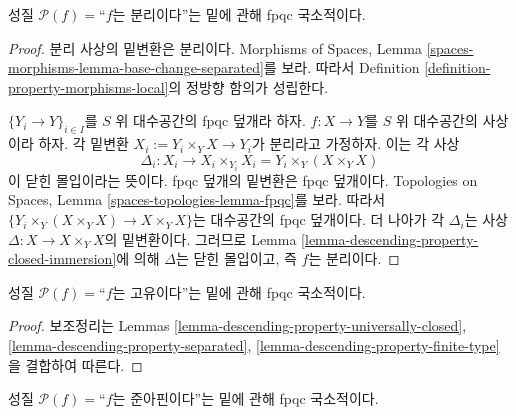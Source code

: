 \begin{lemma}
\label{lemma-descending-property-separated}
성질 $\mathcal{P}(f)=$``$f$는 분리이다''는 밑에 관해 fpqc 국소적이다.
\end{lemma}

\begin{proof}
분리 사상의 밑변환은 분리이다. Morphisms of Spaces, Lemma
\ref{spaces-morphisms-lemma-base-change-separated}를 보라. 따라서
Definition \ref{definition-property-morphisms-local}의 정방향 함의가
성립한다.

\medskip\noindent
$\{Y_i\to Y\}_{i\in I}$를 $S$ 위 대수공간의 fpqc 덮개라 하자.
$f:X\to Y$를 $S$ 위 대수공간의 사상이라 하자. 각 밑변환
$X_i:=Y_i\times_YX\to Y_i$가 분리라고 가정하자. 이는 각 사상
$$
\Delta_i:
X_i
\longrightarrow
X_i \times_{Y_i} X_i = Y_i \times_Y (X \times_Y X)
$$
이 닫힌 몰입이라는 뜻이다. fpqc 덮개의 밑변환은 fpqc 덮개이다.
Topologies on Spaces, Lemma \ref{spaces-topologies-lemma-fpqc}를 보라.
따라서 $\{Y_i\times_Y(X\times_YX)\to X\times_YX\}$는 대수공간의
fpqc 덮개이다. 더 나아가 각 $\Delta_i$는 사상
$\Delta:X\to X\times_YX$의 밑변환이다. 그러므로 Lemma
\ref{lemma-descending-property-closed-immersion}에 의해 $\Delta$는 닫힌
몰입이고, 즉 $f$는 분리이다.
\end{proof}

\begin{lemma}
\label{lemma-descending-property-proper}
성질 $\mathcal{P}(f)=$``$f$는 고유이다''는 밑에 관해 fpqc 국소적이다.
\end{lemma}

\begin{proof}
보조정리는 Lemmas \ref{lemma-descending-property-universally-closed},
\ref{lemma-descending-property-separated},
\ref{lemma-descending-property-finite-type}을 결합하여 따른다.
\end{proof}

\begin{lemma}
\label{lemma-descending-property-quasi-affine}
성질 $\mathcal{P}(f)=$``$f$는 준아핀이다''는 밑에 관해 fpqc 국소적이다.
\end{lemma}


